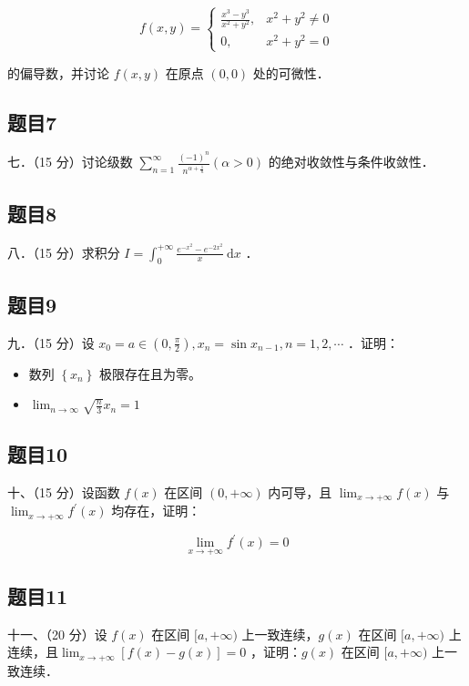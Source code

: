 \documentclass{article}
\begin{document}
\[
f(x, y)= \begin{cases}\frac{x^{3}-y^{3}}{x^{2}+y^{2}}, & x^{2}+y^{2} \neq 0 \\ 0, & x^{2}+y^{2}=0\end{cases}
\]

的偏导数，并讨论 \(f(x, y)\) 在原点 \((0,0)\) 处的可微性．

\subsection{题目7}
七．（15 分）讨论级数 \(\sum_{n=1}^{\infty} \frac{(-1)^{n}}{n^{\alpha+\frac{1}{n}}}(\alpha>0)\) 的绝对收敛性与条件收敛性．

\subsection{题目8}
八．（15 分）求积分 \(I=\int_{0}^{+\infty} \frac{e^{-x^{2}}-e^{-2 x^{2}}}{x} \mathrm{~d} x\) ．

\subsection{题目9}
九．（15 分）设 \(x_{0}=a \in\left(0, \frac{\pi}{2}\right), x_{n}=\sin x_{n-1}, n=1,2, \cdots\) ．证明：

\begin{itemize}
  \item[（1）] 数列 \(\left\{x_{n}\right\}\) 极限存在且为零。
  \item[（2）] \(\lim _{n \rightarrow \infty} \sqrt{\frac{n}{3}} x_{n}=1\)
\end{itemize}

\subsection{题目10}
十、（15 分）设函数 \(f(x)\) 在区间 \((0,+\infty)\) 内可导，且 \(\lim _{x \rightarrow+\infty} f(x)\) 与 \(\lim _{x \rightarrow+\infty} f^{\prime}(x)\) 均存在，证明：

\[
\lim _{x \rightarrow+\infty} f^{\prime}(x)=0
\]

\subsection{题目11}
十一、（20 分）设 \(f(x)\) 在区间 \([a,+\infty)\) 上一致连续，\(g(x)\) 在区间 \([a,+\infty)\) 上连续，且\(\lim _{x \rightarrow+\infty}[f(x)-g(x)]=0\) ，证明：\(g(x)\) 在区间 \([a,+\infty)\) 上一致连续．
\end{document}
